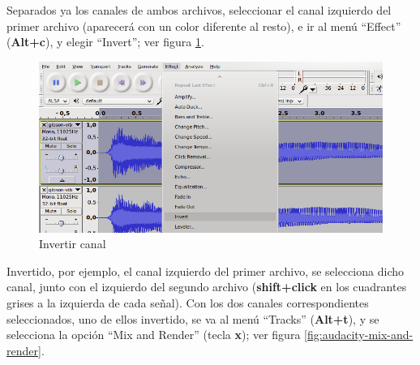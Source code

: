 \documentclass[a4paper,spanish,12pt]{article}
\begin{document}
Separados ya los canales de ambos archivos, seleccionar el canal izquierdo del primer archivo (aparecerá con un color diferente al resto), e ir al menú ``Effect'' (\textbf{Alt+c}), y elegir ``Invert''; ver figura \ref{fig:audacity-invert}.\vspace{\baselineskip}

\begin{figure}[H]
    \centering
    \includegraphics[scale=0.68]{imagenes/audacity-invert.png}
    \caption{Invertir canal}
    \label{fig:audacity-invert}
\end{figure}

Invertido, por ejemplo, el canal izquierdo del primer archivo, se selecciona dicho canal, junto con el izquierdo del segundo archivo (\textbf{shift+click} en los cuadrantes grises a la izquierda de cada señal). Con los dos canales correspondientes seleccionados, uno de ellos invertido, se va al menú ``Tracks'' (\textbf{Alt+t}), y se selecciona la opción ``Mix and Render'' (tecla \textbf{x}); ver figura \ref{fig:audacity-mix-and-render}.
\end{document}
